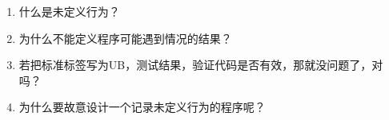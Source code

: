 \begin{enumerate}
\item 
什么是未定义行为？

\item 
为什么不能定义程序可能遇到情况的结果？

\item 
若把标准标签写为UB，测试结果，验证代码是否有效，那就没问题了，对吗？

\item
为什么要故意设计一个记录未定义行为的程序呢？

\end{enumerate}